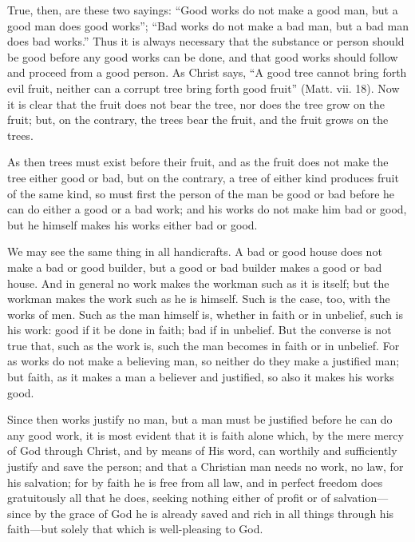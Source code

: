 True, then, are these two sayings: ``Good works do not make a good man, but
a good man does good works''; ``Bad works do not make a bad man, but a bad
man does bad works.'' Thus it is always necessary that the substance or
person should be good before any good works can be done, and that good
works should follow and proceed from a good person. As Christ says, ``A
good tree cannot bring forth evil fruit, neither can a corrupt tree bring
forth good fruit'' (Matt. vii. 18). Now it is clear that the fruit does not
bear the tree, nor does the tree grow on the fruit; but, on the contrary,
the trees bear the fruit, and the fruit grows on the trees.

As then trees must exist before their fruit, and as the fruit does not
make the tree either good or bad, but on the contrary, a tree of either
kind produces fruit of the same kind, so must first the person of the man
be good or bad before he can do either a good or a bad work; and his works
do not make him bad or good, but he himself makes his works either bad or
good.

We may see the same thing in all handicrafts. A bad or good house does not
make a bad or good builder, but a good or bad builder makes a good or bad
house. And in general no work makes the workman such as it is itself; but
the workman makes the work such as he is himself. Such is the case, too,
with the works of men. Such as the man himself is, whether in faith or in
unbelief, such is his work: good if it be done in faith; bad if in
unbelief. But the converse is not true that, such as the work is, such the
man becomes in faith or in unbelief. For as works do not make a believing
man, so neither do they make a justified man; but faith, as it makes a man
a believer and justified, so also it makes his works good.

Since then works justify no man, but a man must be justified before he can
do any good work, it is most evident that it is faith alone which, by the
mere mercy of God through Christ, and by means of His word, can worthily
and sufficiently justify and save the person; and that a Christian man
needs no work, no law, for his salvation; for by faith he is free from all
law, and in perfect freedom does gratuitously all that he does, seeking
nothing either of profit or of salvation—since by the grace of God
he is already saved and rich in all things through his faith—but
solely that which is well-pleasing to God.

